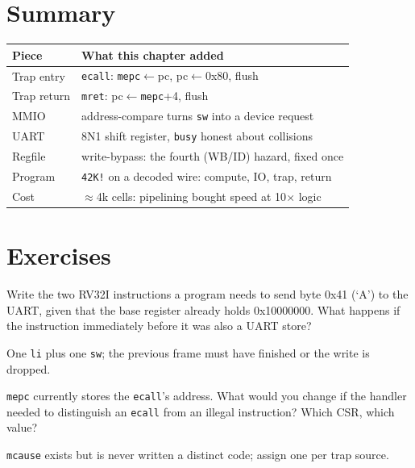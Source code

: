 \section{Summary}
\label{sec:summary08}
\begin{tabularx}{\linewidth}{@{}l X@{}}
\toprule
\textbf{Piece} & \textbf{What this chapter added} \\
\midrule
Trap entry  & \texttt{ecall}: \texttt{mepc}$\leftarrow$pc, pc$\leftarrow$0x80, flush \\
Trap return & \texttt{mret}: pc$\leftarrow$\texttt{mepc}+4, flush \\
MMIO        & address-compare turns \texttt{sw} into a device request \\
UART        & 8N1 shift register, \texttt{busy} honest about collisions \\
Regfile     & write-bypass: the fourth (WB/ID) hazard, fixed once \\
Program     & \texttt{42K!} on a decoded wire: compute, IO, trap, return \\
Cost        & $\approx$4k cells: pipelining bought speed at 10$\times$ logic \\
\bottomrule
\end{tabularx}

\section*{Exercises}

\begin{exercise}[easy]

Write the two RV32I instructions a program needs to send byte
0x41 (`A') to the UART, given that the base register already
holds 0x10000000. What happens if the instruction immediately
before it was also a UART store?
\end{exercise}
\begin{solution}[hint]
One \texttt{li} plus one \texttt{sw}; the previous frame must
have finished or the write is dropped.
\end{solution}

\begin{exercise}[easy]

\texttt{mepc} currently stores the \texttt{ecall}'s address. What
would you change if the handler needed to distinguish an
\texttt{ecall} from an illegal instruction? Which CSR, which value?
\end{exercise}
\begin{solution}[hint]
\texttt{mcause} exists but is never written a distinct code;
assign one per trap source.
\end{solution}

